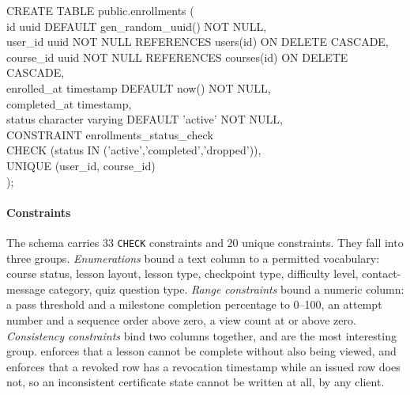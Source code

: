 \documentclass[12pt, oneside]{article} %
\newcommand{\tcode}[1]{\path{#1}}
\begin{document}
\begin{tcolorbox}[listing only, breakable, boxsep=2pt, left=2pt, right=2pt]
\footnotesize\ttfamily
CREATE TABLE public.enrollments ( \\
\hspace*{4mm}id uuid DEFAULT gen\_random\_uuid() NOT NULL, \\
\hspace*{4mm}user\_id uuid NOT NULL REFERENCES users(id) ON DELETE CASCADE, \\
\hspace*{4mm}course\_id uuid NOT NULL REFERENCES courses(id) ON DELETE CASCADE, \\
\hspace*{4mm}enrolled\_at timestamp DEFAULT now() NOT NULL, \\
\hspace*{4mm}completed\_at timestamp, \\
\hspace*{4mm}status character varying DEFAULT 'active' NOT NULL, \\
\hspace*{4mm}CONSTRAINT enrollments\_status\_check \\
\hspace*{8mm}CHECK (status IN ('active','completed','dropped')), \\
\hspace*{4mm}UNIQUE (user\_id, course\_id) \\
);
\end{tcolorbox}

\paragraph{Constraints}

The schema carries 33 \texttt{CHECK} constraints and 20 unique constraints. They fall into three groups. \emph{Enumerations} bound a text column to a permitted vocabulary: course status, lesson layout, lesson type, checkpoint type, difficulty level, contact-message category, quiz question type. \emph{Range constraints} bound a numeric column: a pass threshold and a milestone completion percentage to 0--100, an attempt number and a sequence order above zero, a view count at or above zero. \emph{Consistency constraints} bind two columns together, and are the most interesting group. \tcode{lesson_progress} enforces that a lesson cannot be complete without also being viewed, and \tcode{certificates} enforces that a revoked row has a revocation timestamp while an issued row does not, so an inconsistent certificate state cannot be written at all, by any client.
\end{document}
